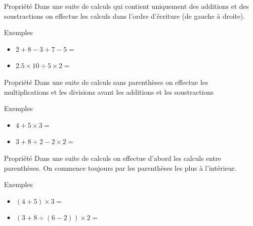 \documentclass[xcolor={dvipsnames}]{beamer}
\begin{document}
\begin{frame}{}
	\begin{alertblock}{Propriété}
		Dans une suite de calculs qui contient uniquement des additions et des soustractions on effectue les calculs dans l'ordre d'écriture (de gauche à droite).
	\end{alertblock}
	
	
	\begin{exampleblock}{Exemples}
		\begin{itemize}
			\item $2 + 8 - 3 + 7 - 5 =$ \vspace*{2cm}
			
			
			\item $ \num{2.5} \times 10 \div 5 \times 2 = $\vspace*{1cm}
		\end{itemize}
	\end{exampleblock}
\end{frame}


\begin{frame}{}
	\begin{alertblock}{Propriété}
		Dans une suite de calculs sans parenthèses on effectue les multiplications et les divisions avant les additions et les soustractions
	\end{alertblock}
	
	
	\begin{exampleblock}{Exemples}
		\begin{itemize}
			\item $4 + 5 \times 3 = $ \vspace*{2cm}
			
			
			\item $ 3 + 8 \div 2 - 2 \times 2 = $\vspace*{1cm}
		\end{itemize}
	\end{exampleblock}
\end{frame}

\begin{frame}{}
	\begin{alertblock}{Propriété}
		Dans une suite de calculs on effectue d'abord les calculs entre parenthèses. On commence toujours par les parenthèses les plus à l'intérieur.
	\end{alertblock}
	
	
	\begin{exampleblock}{Exemples}
		\begin{itemize}
			\item $(4 + 5) \times 3 =$  \vspace*{2cm}
			
			
			\item $ (3 + 8 \div (6 - 2)) \times 2 = $ \vspace*{1cm}
		\end{itemize}
	\end{exampleblock}
\end{frame}
\end{document}
